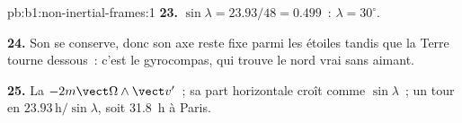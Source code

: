 \begin{solution}{pb:b1:non-inertial-frames:1}
\textbf{23.} $\sin\lambda = 23.93/48 = 0.499$~: $\lambda = 30^\circ$.

\textbf{24.} Son  se conserve, donc son axe reste fixe
parmi les étoiles tandis que la Terre tourne dessous~: c'est le
gyrocompas, qui trouve le nord vrai sans aimant.

\textbf{25.} La  $-2m\vect\Omega\wedge\vect v'$~; sa part
horizontale croît comme $\sin\lambda$~; un tour en $23.93\,\text{h}/\sin\lambda$,
soit \qty{31.8}{h} à Paris.
\end{solution}
